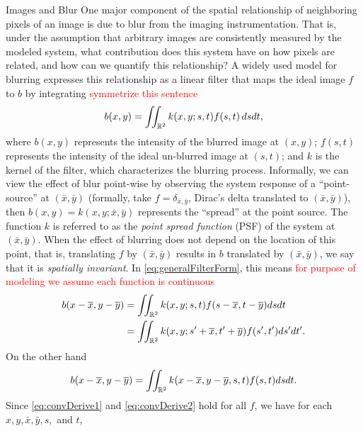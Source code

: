 \begin{chapter}{Images and Blur}
  One major component of the spatial relationship of neighboring pixels of an image is due to blur from the imaging instrumentation.
  That is, under the assumption that arbitrary images are consistently measured by the modeled system, what contribution does this system have on how pixels are related, and how can we quantify this relationship?
  A widely used model for blurring \citep{hansen2010,jain1989,vogel2002,epstein2008} expresses this relationship as a linear filter that maps the ideal image $f$ to $b$ by integrating
  \textcolor{red}{symmetrize this sentence}
\begin{equation}\label{eq:generalFilterForm}
  b(x,y) = \iint_{\mathbb R^2} k(x,y;s,t) f(s,t)\,dsdt,
\end{equation}
  where $b(x,y)$ represents the intensity of the blurred image at $(x,y)$; $f(s,t)$ represents the intensity of the ideal un-blurred image at $(s,t)$; and $k$ is the kernel of the filter, which characterizes the blurring process.
  Informally, we can view the effect of blur point-wise by observing the system response of a ``point-source'' at $(\bar x,\bar y)$ (formally, take $f = \delta_{\bar x,\bar y}$, Dirac's delta translated to $(\bar x,\bar y)$), then $b(x,y) = k(x,y;\bar x,\bar y)$ represents the ``spread'' at the point source.
  The function $k$ is referred to as the \emph{point spread function} (PSF) of the system at $(\bar x,\bar y)$.
  When the effect of blurring does not depend on the location of this point, that is, translating $f$ by $(\bar x, \bar y)$ results in $b$ translated by $(\bar x,\bar y)$, we say that it is \emph{spatially invariant}. 
  In \eqref{eq:generalFilterForm}, this means
  \textcolor{red}{for purpose of modeling we assume each function is continuous}
\begin{align} 
  b(x-\overline x,y-\overline y) 
  &= \iint_{\mathbb R^2} k(x,y;s,t) f(s-\overline x,t - \overline y)dsdt \nonumber\\
  &= \iint_{\mathbb R^2} k(x,y;s'+\overline x,t'+\overline y) f(s',t')ds'dt'.\label{eq:convDerive1}
\end{align}
  On the other hand
\begin{equation} \label{eq:convDerive2}
  b(x-\overline x,y-\overline y) = \iint_{\mathbb R^2} k(x-\overline x,y-\overline y,s,t) f(s,t)dsdt. 
\end{equation}
  Since \eqref{eq:convDerive1} and \eqref{eq:convDerive2} hold for all $f$, we have for each $x,y,\bar x, \bar y,s,$ and $t$,
\begin{align} 

\end{align}
\end{chapter}
